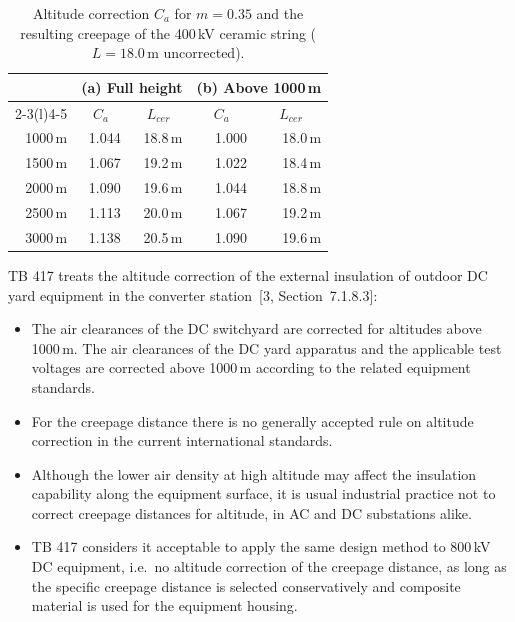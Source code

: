 \begin{table}[!ht]
  \centering
  \begin{tabular}{@{}r r r r r@{}}
    \toprule
    & \multicolumn{2}{c}{\textbf{(a) Full height}}
    & \multicolumn{2}{c}{\textbf{(b) Above 1000\,m}} \\
    \cmidrule(lr){2-3}\cmidrule(l){4-5}
    \multicolumn{1}{c}{\textbf{Altitude $H$}}
      & \multicolumn{1}{c}{\textbf{$C_{a}$}} & \multicolumn{1}{c}{\textbf{$L_{cer}$}}
      & \multicolumn{1}{c}{\textbf{$C_{a}$}} & \multicolumn{1}{c}{\textbf{$L_{cer}$}} \\
    \midrule
    1000\,m & 1.044 & 18.8\,m & 1.000 & 18.0\,m \\
    1500\,m & 1.067 & 19.2\,m & 1.022 & 18.4\,m \\
    2000\,m & 1.090 & 19.6\,m & 1.044 & 18.8\,m \\
    2500\,m & 1.113 & 20.0\,m & 1.067 & 19.2\,m \\
    3000\,m & 1.138 & 20.5\,m & 1.090 & 19.6\,m \\
    \bottomrule
  \end{tabular}
  \caption{Altitude correction $C_{a}$ for $m = 0.35$ and the resulting
  creepage of the 400\,kV ceramic string ($L = 18.0\,\mathrm{m}$ uncorrected).}
  \label{tab:altitude}
\end{table}

\FloatBarrier
TB 417 treats the altitude correction of the external insulation of outdoor
DC yard equipment in the converter station~[3, Section~7.1.8.3]:

\begin{itemize}[itemsep=0.2em]
  \item The air clearances of the DC switchyard are corrected for altitudes
        above 1000\,m. The air clearances of the DC yard apparatus and the
        applicable test voltages are corrected above 1000\,m according to the
        related equipment standards.
  \item For the creepage distance there is no generally accepted rule on
        altitude correction in the current international standards.
  \item Although the lower air density at high altitude may affect the
        insulation capability along the equipment surface, it is usual
        industrial practice not to correct creepage distances for altitude,
        in AC and DC substations alike.
  \item TB 417 considers it acceptable to apply the same design method to
        800\,kV DC equipment, i.e.\ no altitude correction of the creepage
        distance, as long as the specific creepage distance is selected
        conservatively and composite material is used for the equipment
        housing.
\end{itemize}


